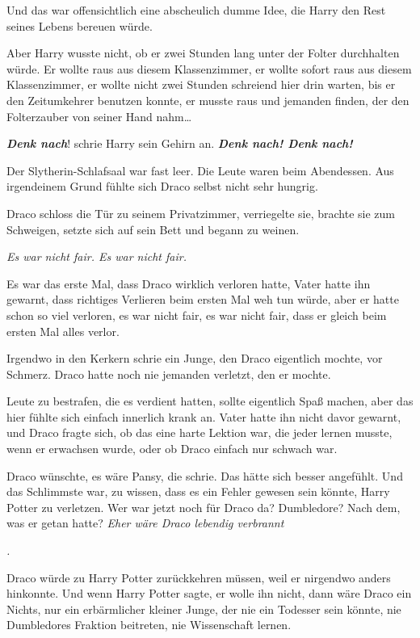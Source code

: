 {Und das war offensichtlich eine abscheulich dumme Idee, die Harry den Rest seines Lebens bereuen würde.

Aber Harry wusste nicht, ob er zwei Stunden lang unter der Folter durchhalten würde. Er wollte raus aus diesem Klassenzimmer, er wollte sofort raus aus diesem Klassenzimmer, er wollte nicht zwei Stunden schreiend hier drin warten, bis er den Zeitumkehrer benutzen konnte, er musste raus und jemanden finden, der den Folterzauber von seiner Hand nahm…

\textbf{\emph{Denk nach}}! schrie Harry sein Gehirn an. \textbf{\emph{Denk nach! Denk nach!}}

Der Slytherin-Schlafsaal war fast leer. Die Leute waren beim Abendessen. Aus irgendeinem Grund fühlte sich Draco selbst nicht sehr hungrig.

Draco schloss die Tür zu seinem Privatzimmer, verriegelte sie, brachte sie zum Schweigen, setzte sich auf sein Bett und begann zu weinen.

\emph{Es war nicht fair. Es war nicht fair.}

Es war das erste Mal, dass Draco wirklich verloren hatte, Vater hatte ihn gewarnt, dass richtiges Verlieren beim ersten Mal weh tun würde, aber er hatte schon so viel verloren, es war nicht fair, es war nicht fair, dass er gleich beim ersten Mal alles verlor.

Irgendwo in den Kerkern schrie ein Junge, den Draco eigentlich mochte, vor Schmerz. Draco hatte noch nie jemanden verletzt, den er mochte.

Leute zu bestrafen, die es verdient hatten, sollte eigentlich Spaß machen, aber das hier fühlte sich einfach innerlich krank an. Vater hatte ihn nicht davor gewarnt, und Draco fragte sich, ob das eine harte Lektion war, die jeder lernen musste, wenn er erwachsen wurde, oder ob Draco einfach nur schwach war.

Draco wünschte, es wäre Pansy, die schrie. Das hätte sich besser angefühlt. Und das Schlimmste war, zu wissen, dass es ein Fehler gewesen sein könnte, Harry Potter zu verletzen. Wer war jetzt noch für Draco da? Dumbledore? Nach dem, was er getan hatte? \emph{Eher wäre Draco lebendig verbrannt}

\emph{.}

Draco würde zu Harry Potter zurückkehren müssen, weil er nirgendwo anders hinkonnte. Und wenn Harry Potter sagte, er wolle ihn nicht, dann wäre Draco ein Nichts, nur ein erbärmlicher kleiner Junge, der nie ein Todesser sein könnte, nie Dumbledores Fraktion beitreten, nie Wissenschaft lernen.

}
